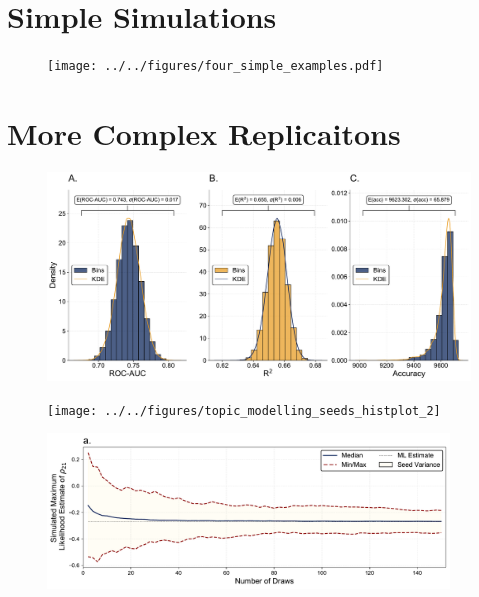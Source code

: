 \documentclass[12pt]{beamer}
\begin{document}
\section{Simple Simulations}
\begin{frame}
\begin{center}
\begin{figure}
	\texttt{[image: ../../figures/four\_simple\_examples.pdf]}
\end{figure}
\end{center}
\end{frame}

\section{More Complex Replicaitons}
\begin{frame}
\begin{center}
\begin{figure}
	\includegraphics[width=\textwidth]{../../figures/prediction_seeds.pdf}
\end{figure}
\end{center}
\end{frame}

\begin{frame}
\begin{center}
\begin{figure}
	\texttt{[image: ../../figures/topic\_modelling\_seeds\_histplot\_2]}
\end{figure}
\end{center}
\end{frame}

\begin{frame}
\begin{center}
\begin{figure}
	\includegraphics[width=0.95\textwidth]{../../figures/mvprobit.pdf}
\end{figure}
\end{center}
\end{frame}
\end{document}
